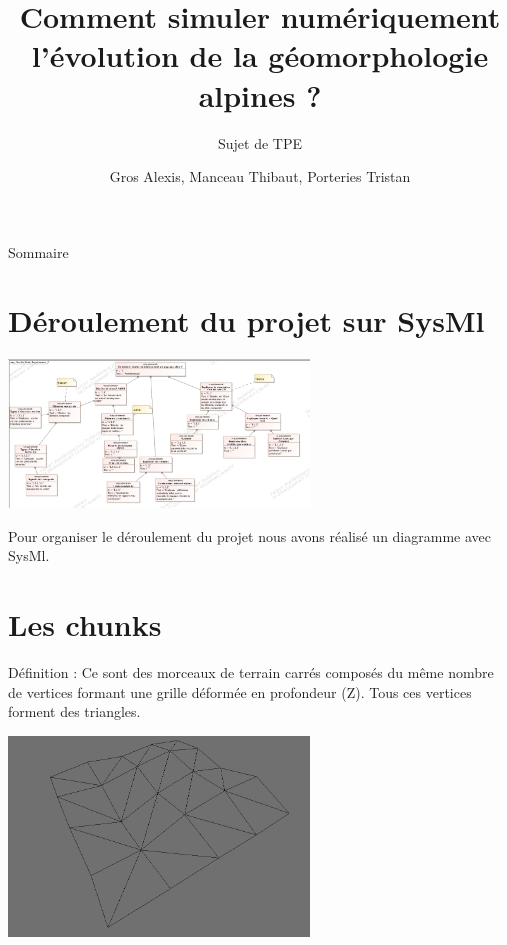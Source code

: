 \documentclass{beamer}
\title{Comment simuler numériquement l'évolution de la géomorphologie alpines ?}
\subtitle{Sujet de TPE}
\author{Gros Alexis, Manceau Thibaut, Porteries Tristan}
\begin{document}
\frame{\titlepage}

\begin{frame}{Sommaire}
\small \tableofcontents
\end{frame}

\section{Déroulement du projet sur SysMl}
\begin{frame}
   \begin{center}
      \includegraphics[width=8cm]{sysml.png}
   \end{center}
   Pour organiser le déroulement du projet nous avons réalisé un diagramme avec SysMl.
\end{frame}

\section{Les chunks}
\begin{frame}
  Définition : Ce sont des morceaux de terrain carrés composés du même nombre de vertices formant une grille déformée en profondeur (Z).
  Tous ces vertices forment des triangles.
  \begin{center}
    \includegraphics[width=8cm]{chunk_simple_wireframe.png}
  \end{center}
\end{frame}
\end{document}
